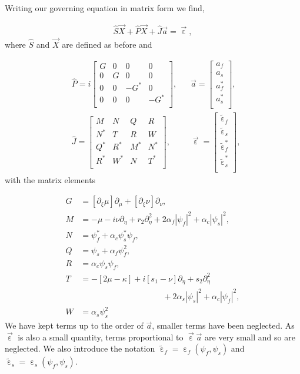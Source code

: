 \documentclass[reprint,
 amsmath,amssymb,
 pra,
]{revtex4-1}
\newcommand{\eq}[1]{
\begin{equation}\begin{aligned}
#1
\end{aligned}\end{equation}}
\DeclareMathOperator{\eps}{\varepsilon}
\begin{document}
Writing our governing equation in matrix form we find,
\eq{\label{e:pert_Eq.}
\hat{S}\vec{X} + \hat{P}\vec{X} + \hat{J}\vec{a} = \vec{\eps},
}
where $\hat{S}$ and $\vec{X}$ are defined as before and
\eq{
&\hat{P} = i \begin{bmatrix}
G & 0 & 0 & 0 \\
0 & G & 0 & 0 \\
0 & 0 & -G^* & 0 \\
0 & 0 & 0 & -G^* \\
\end{bmatrix}, \,\,\,\,\,
&\vec{a} = \begin{bmatrix}
a_f\\
a_s\\
a_f^*\\
a_s^*\\
\end{bmatrix},\\
&\hat{J} = \begin{bmatrix}
M & N & Q & R \\
N^* & T & R & W \\
Q^* & R^* & M^* & N^* \\
R^* & W^* & N & T^* \\
\end{bmatrix}, \,\,\,\,\,
&\vec{\eps} = \begin{bmatrix}
\tilde{\eps}_f\\
\tilde{\eps}_s \\
\tilde{\eps}_f^* \\
\tilde{\eps}_s^* \\
\end{bmatrix},
}
with the matrix elements
\eq{
G &= [\partial_\xi \mu] \partial_\mu + [\partial_\xi \nu ]\partial_\nu , \\
M &= -\mu -i\nu\partial_\eta  + r_2\partial_\eta^2+ 2\alpha_f |\psi_f|^2 + \alpha_c |\psi_s|^2, \\
N &= \psi_f^* + \alpha_c \psi_s^* \psi_f,\\
Q &= \psi_s + \alpha_f \psi_f^2,\\
R &= \alpha_c \psi_s \psi_f,\\
T &= -[2\mu - \kappa] + i[s_1-\nu] \partial_\eta + s_2 \partial_\eta^2 \\&\qquad\qquad\qquad\qquad\qquad+ 2\alpha_s |\psi_s|^2 + \alpha_c |\psi_f|^2,\\
W &= \alpha_s \psi_s^2
}
We have kept terms up to the order of $\vec{a}$, smaller terms have been neglected. As $\vec{\eps}$ is also a small quantity, terms proportional to $\vec{\eps}\vec{a}$ are very small and so are neglected. We also introduce the notation $\tilde{\eps}_f = \eps_f(\psi_f, \psi_s)$ and $\tilde{\eps}_s = \eps_s(\psi_f, \psi_s)$.
\end{document}
